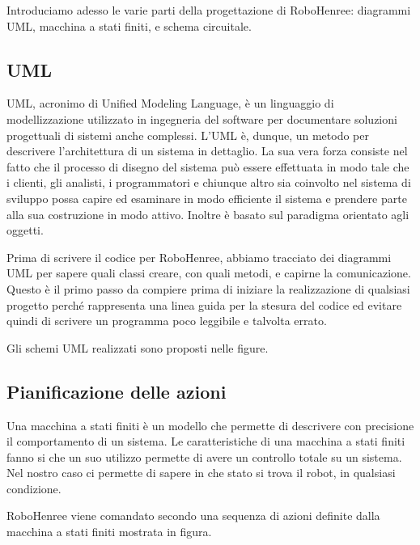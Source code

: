 \documentclass[a4paper,12pt,italian]{article}
\begin{document}
Introduciamo adesso le varie parti della progettazione di RoboHenree: diagrammi UML, macchina a stati finiti, e schema circuitale.

\subsection{UML}
UML, acronimo di Unified Modeling Language, è un linguaggio di modellizzazione utilizzato in ingegneria del software per documentare soluzioni progettuali di sistemi anche complessi. L’UML è, dunque, un metodo per descrivere l’architettura di un sistema in dettaglio. La sua vera forza consiste nel fatto che il processo di disegno del sistema può essere effettuata in modo tale che i clienti, gli analisti, i programmatori e chiunque altro sia coinvolto nel sistema di sviluppo possa capire ed esaminare in modo efficiente il sistema e prendere parte alla sua costruzione in modo attivo. Inoltre è basato sul paradigma orientato agli oggetti. 

Prima di scrivere il codice per RoboHenree, abbiamo tracciato dei diagrammi UML per sapere quali classi creare, con quali metodi, e capirne la comunicazione. Questo è il primo passo da compiere prima di iniziare la realizzazione di qualsiasi progetto perché rappresenta una linea guida per la stesura del codice ed evitare quindi di scrivere un programma poco leggibile e talvolta errato. 

Gli schemi UML realizzati sono proposti nelle figure.


\subsection{Pianificazione delle azioni}
\label{Sec: FSM}

Una macchina a stati finiti è un modello che permette di descrivere con precisione il comportamento di un sistema. Le caratteristiche di una macchina a stati finiti fanno si che un suo utilizzo permette di avere un controllo totale su un sistema. Nel nostro caso ci permette di sapere in che stato si trova il robot, in qualsiasi condizione.

RoboHenree viene comandato secondo una sequenza di azioni definite dalla macchina a stati finiti mostrata in figura.
\end{document}
